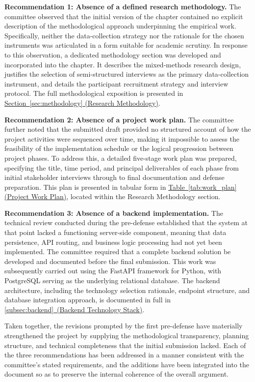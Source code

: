 \documentclass[12pt,a4paper]{report}
\begin{document}
\textbf{Recommendation 1: Absence of a defined research methodology.}
The committee observed that the initial version of the chapter contained no
explicit description of the methodological approach underpinning the
empirical work. Specifically, neither the data-collection strategy nor the
rationale for the chosen instruments was articulated in a form suitable for
academic scrutiny. In response to this observation, a dedicated methodology
section was developed and incorporated into the chapter. It describes the
mixed-methods research design, justifies the selection of semi-structured
interviews as the primary data-collection instrument, and details the
participant recruitment strategy and interview protocol. The full
methodological exposition is presented in
\hyperref[sec:methodology]{Section~\ref{sec:methodology} (Research
Methodology)}.

\textbf{Recommendation 2: Absence of a project work plan.}
The committee further noted that the submitted draft provided no structured
account of how the project activities were sequenced over time, making it
impossible to assess the feasibility of the implementation schedule or the
logical progression between project phases. To address this, a detailed
five-stage work plan was prepared, specifying the title, time period, and
principal deliverables of each phase from initial stakeholder interviews
through to final documentation and defense preparation. This plan is
presented in tabular form in
\hyperref[tab:work_plan]{Table~\ref{tab:work_plan} (Project Work Plan)},
located within the Research Methodology section.

\textbf{Recommendation 3: Absence of a backend implementation.}
The technical review conducted during the pre-defense established that the
system at that point lacked a functioning server-side component, meaning
that data persistence, API routing, and business logic processing had not
yet been implemented. The committee required that a complete backend
solution be developed and documented before the final submission. This
work was subsequently carried out using the FastAPI framework for Python,
with PostgreSQL serving as the underlying relational database. The backend
architecture, including the technology selection rationale, endpoint
structure, and database integration approach, is documented in full in
\hyperref[subsec:backend]{\ref{subsec:backend}~(Backend Technology Stack)}.

Taken together, the revisions prompted by the first pre-defense have
materially strengthened the project by supplying the methodological
transparency, planning structure, and technical completeness that the
initial submission lacked. Each of the three recommendations has been
addressed in a manner consistent with the committee's stated requirements,
and the additions have been integrated into the document so as to
preserve the internal coherence of the overall argument.
\end{document}
